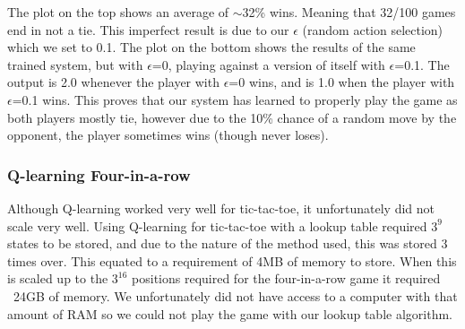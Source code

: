 \documentclass[12pt,a4paper]{article}
\begin{document}
The plot on the top shows an average of $\sim$32\% wins. Meaning that 32/100 games end in not a tie. This imperfect result is due to our $\epsilon$ (random action selection) which we set to 0.1. The plot on the bottom shows the results of the same trained system, but with $\epsilon$=0, playing against a version of itself with $\epsilon$=0.1.
The output is 2.0 whenever the player with $\epsilon$=0 wins, and is 1.0 when the player with $\epsilon$=0.1 wins. This proves that our system has learned to properly play the game as both players mostly tie, however due to the 10\% chance of a random move by the opponent, the player sometimes wins (though never loses).
\subsubsection*{Q-learning Four-in-a-row}
Although Q-learning worked very well for tic-tac-toe, it unfortunately did not scale very well. Using Q-learning for tic-tac-toe with a lookup table required $3^{9}$ states to be stored, and due to the nature of the method used, this was stored 3 times over. This equated to a requirement of 4MB of memory to store. When this is scaled up to the $3^{16}$ positions required for the four-in-a-row game it required ~24GB of memory. We unfortunately did not have access to a computer with that amount of RAM so we could not play the game with our lookup table algorithm.
\end{document}
